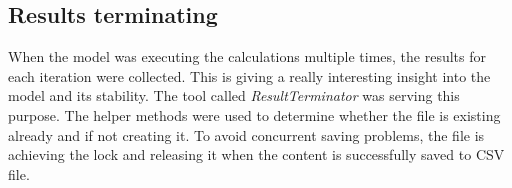 \subsection{Results terminating}\label{subsec:results-terminating}
When the model was executing the calculations multiple times, the results for each iteration were collected.
This is giving a really interesting insight into the model and its stability.
The tool called \mbox{\textit{ResultTerminator}} was serving this purpose.
The helper methods were used to determine whether the file is existing already and if not creating it.
To avoid concurrent saving problems, the file is achieving the lock and releasing it when the content is successfully saved to CSV file.
